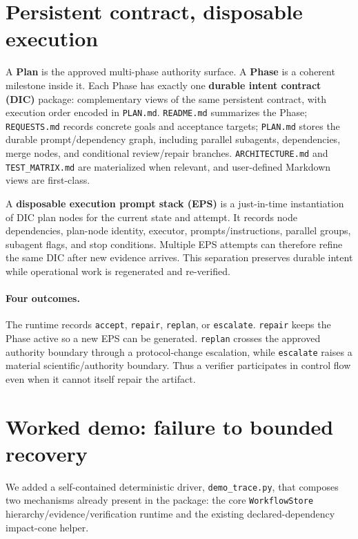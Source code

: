 \documentclass{article}
\begin{document}
\section{Persistent contract, disposable execution}
A \textbf{Plan} is the approved multi-phase authority surface. A \textbf{Phase} is a coherent milestone inside it. Each Phase has exactly one \textbf{durable intent contract (DIC)} package: complementary views of the same persistent contract, with execution order encoded in \texttt{PLAN.md}. \texttt{README.md} summarizes the Phase; \texttt{REQUESTS.md} records concrete goals and acceptance targets; \texttt{PLAN.md} stores the durable prompt/dependency graph, including parallel subagents, dependencies, merge nodes, and conditional review/repair branches. \texttt{ARCHITECTURE.md} and \texttt{TEST\_MATRIX.md} are materialized when relevant, and user-defined Markdown views are first-class.

A \textbf{disposable execution prompt stack (EPS)} is a just-in-time instantiation of DIC plan nodes for the current state and attempt. It records node dependencies, plan-node identity, executor, prompts/instructions, parallel groups, subagent flags, and stop conditions. Multiple EPS attempts can therefore refine the same DIC after new evidence arrives. This separation preserves durable intent while operational work is regenerated and re-verified.

\paragraph{Four outcomes.}
The runtime records \texttt{accept}, \texttt{repair}, \texttt{replan}, or \texttt{escalate}. \texttt{repair} keeps the Phase active so a new EPS can be generated. \texttt{replan} crosses the approved authority boundary through a protocol-change escalation, while \texttt{escalate} raises a material scientific/authority boundary. Thus a verifier participates in control flow even when it cannot itself repair the artifact.

\section{Worked demo: failure to bounded recovery}
We added a self-contained deterministic driver, \texttt{demo\_trace.py}, that composes two mechanisms already present in the package: the core \texttt{WorkflowStore} hierarchy/evidence/verification runtime and the existing declared-dependency impact-cone helper.
\end{document}
